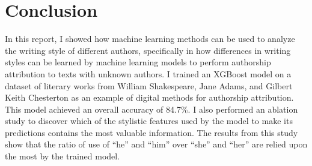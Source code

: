 \documentclass{article}
\begin{document}
\section{Conclusion}
In this report, I showed how machine learning methods can be used to analyze the writing style of different authors, specifically in how differences in writing styles can be learned by machine learning models to perform authorship attribution to texts with unknown authors.
I trained an XGBoost model on a dataset of literary works from William Shakespeare, Jane Adams, and Gilbert Keith Chesterton as an example of digital methods for authorship attribution.
This model achieved an overall accuracy of 84.7\%.
I also performed an ablation study to discover which of the stylistic features used by the model to make its predictions contains the most valuable information.
The results from this study show that the ratio of use of ``he'' and ``him'' over ``she'' and ``her'' are relied upon the most by the trained model.


\end{document}
